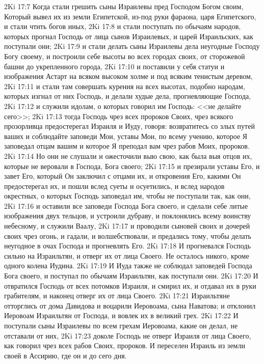 \rsbpar\vs 2Ki 17:7 Когда стали грешить сыны Израилевы пред Господом Богом своим, Который вывел их из земли Египетской, из-под руки фараона, царя Египетского, и стали чтить богов иных,
\vs 2Ki 17:8 и стали поступать по обычаям народов, которых прогнал Господь от лица сынов Израилевых, и  царей Израильских, как поступали они;
\vs 2Ki 17:9 и стали делать сыны Израилевы дела неугодные Господу Богу своему, и построили себе высоты во всех городах своих,  от сторожевой башни до укрепленного города,
\vs 2Ki 17:10 и поставили у себя статуи и изображения Астарт на всяком высоком холме и под всяким тенистым деревом,
\vs 2Ki 17:11 и стали там совершать курения на всех высотах, подобно народам, которых изгнал от них Господь, и делали худые дела, прогневляющие Господа,
\vs 2Ki 17:12 и служили идолам, о которых говорил им Господь: <<не делайте сего>>;
\vs 2Ki 17:13 тогда Господь чрез всех пророков Своих, чрез всякого прозорливца предостерегал Израиля и Иуду, говоря: возвратитесь со злых путей ваших и соблюдайте заповеди Мои, уставы Мои, по всему учению, которое Я заповедал отцам вашим и которое Я преподал вам чрез рабов Моих, пророков.
\vs 2Ki 17:14 Но они не слушали и ожесточили выю свою, как была выя отцов их, которые не веровали в Господа, Бога своего;
\vs 2Ki 17:15 и презирали уставы Его, и завет Его, который Он заключил с отцами их, и откровения Его, какими Он предостерегал их, и пошли вслед суеты и осуетились, и вслед народов окрестных, о которых Господь заповедал им, чтобы не поступали так, как они,
\vs 2Ki 17:16 и оставили все заповеди Господа Бога своего, и сделали себе литые изображения двух тельцов, и устроили дубраву, и поклонялись всему воинству небесному, и служили Ваалу,
\vs 2Ki 17:17 и проводили сыновей своих и дочерей своих чрез огонь, и гадали, и волшебствовали, и предались тому, чтобы делать неугодное в очах Господа и прогневлять Его.
\rsbpar\vs 2Ki 17:18 И прогневался Господь сильно на Израильтян, и отверг их от лица Своего. Не осталось никого, кроме одного колена Иудина.
\vs 2Ki 17:19 И Иуда также не соблюдал заповедей Господа Бога своего, и поступал по обычаям Израильтян, как поступали они.
\vs 2Ki 17:20 И отвратился Господь от всех потомков Израиля, и смирил их, и отдавал их в руки грабителям, и наконец отверг их от лица Своего.
\vs 2Ki 17:21 Израильтяне отторглись от дома Давидова и воцарили Иеровоама, сына Наватова; и отклонил Иеровоам Израильтян от Господа, и вовлек их в великий грех.
\vs 2Ki 17:22 И поступали сыны Израилевы по всем грехам Иеровоама, какие он делал, не отставали от них,
\vs 2Ki 17:23 доколе Господь не отверг Израиля от лица Своего, как говорил чрез всех рабов Своих, пророков. И переселен Израиль из земли своей в Ассирию, где он и до сего дня.
